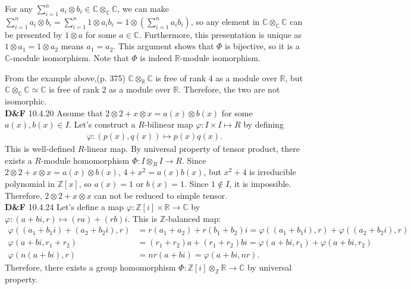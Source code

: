 \documentclass[a4paper, 12pt]{article}
\theoremstyle{Mydefinition}
\theoremstyle{Mytheorem}
\begin{document}
For any $\sum_{i=1}^n a_i\otimes b_i\in \mathbb{C}\otimes_\mathbb{C}\mathbb{C}$, we can make $\sum_{i=1}^n a_i\otimes b_i =\sum_{i=1}^n 1\otimes a_ib_i = 1\otimes \left(\sum_{i=1}^n a_ib_i\right)$, so any element in $\mathbb{C}\otimes_\mathbb{C}\mathbb{C}$ can be presented by $1\otimes a$ for some $a\in\mathbb{C}$. Furthermore, this presentation is unique as $1\otimes a_1 = 1\otimes a_2$ means $a_1=a_2$. This argument shows that $\Phi$ is bijective, so it is a $\mathbb{C}$-module isomorphism. Note that $\Phi$ is indeed $\mathbb{R}$-module isomorphism.

From the example above,(p. 375) $\mathbb{C}\otimes_\mathbb{R}\mathbb{C}$ is free of rank $4$ as a module over $\mathbb{R}$, but $\mathbb{C}\otimes_\mathbb{C}\mathbb{C}\simeq \mathbb{C}$ is free of rank $2$ as a module over $\mathbb{R}$. Therefore, the two are not isomorphic.\\

\noindent \textbf{D\&F} 10.4.20
Assume that $2\otimes 2 + x\otimes x = a(x)\otimes b(x)$ for some $a(x),b(x)\in I$. Let's construct a $R$-bilinear map $\varphi : I\times I\mapsto R$ by defining
\begin{equation}
    \begin{split}
        \varphi:(p(x), q(x))\mapsto p(x)q(x).
    \end{split}
\end{equation}
This is well-defined $R$-linear map. By universal property of tensor product, there exists a $R$-module homomorphism $\Phi:I\otimes_R I\rightarrow R$. Since $2\otimes 2 + x\otimes x = a(x)\otimes b(x)$, $4+x^2 = a(x)b(x)$, but $x^2+4$ is irreducible polynomial in $\mathbb{Z}[x]$, so $a(x)=1$ or $b(x)=1$. Since $1\not\in I$, it is impossible. Therefore, $2\otimes 2 + x\otimes x$ can not be reduced to simple tensor.\\

\noindent \textbf{D\&F} 10.4.24
Let's define a map $\varphi:\mathbb{Z}[i]\times \mathbb{R}\rightarrow \mathbb{C}$ by $\varphi:(a+bi, r)\mapsto (ra)+(rb)i$. This is $\mathbb{Z}$-balanced map:
\begin{equation}
    \begin{split}
        \varphi((a_1+b_1i)+(a_2+b_2i), r) &= r(a_1+a_2)+r(b_1+b_2)i = \varphi((a_1+b_1i), r) + \varphi((a_2+b_2i), r)\\
        \varphi(a+bi, r_1+r_2) &= (r_1+r_2)a+(r_1+r_2)bi = \varphi(a+bi, r_1) + \varphi(a+bi, r_2)\\
        \varphi(n(a+bi), r) &= nr(a+bi) = \varphi(a+bi, nr).
    \end{split}
\end{equation}
Therefore, there exists a group homomorphism $\Phi:\mathbb{Z}[i]\otimes_{\mathbb{Z}} \mathbb{R}\rightarrow \mathbb{C}$ by universal property. 
\end{document}
